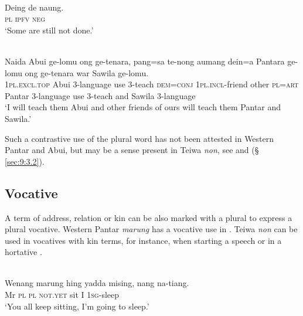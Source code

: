 \ea%
\label{ex:9:86}
 \\
\gll Deing de naung. \\
 \textsc{pl} \textsc{ipfv} \textsc{neg}   \\
\glt `Some are still not done.'
\z







\ea%
\label{ex:9:87}
 \\
\gll  Naida Abui ge-lomu ong ge-tenara,  pang=sa te-nong aumang dein=a  Pantara ge-lomu ong ge-tenara war Sawila ge-lomu. \\
  \textsc{1pl.excl.top} Abui 3-language use 3-teach  \textsc{dem=conj} \textsc{1pl.incl}-friend other \textsc{pl=art}   Pantar 3-language use 3-teach and Sawila 3-language  \\
\glt `I will teach them Abui and other friends of ours  will teach them Pantar and Sawila.'
\z

Such a contrastive use of the plural word has not been attested in Western Pantar and Abui, but may be a sense present in Teiwa \textit{non}, see  and  ({\S} \ref{sec:9:3.2}).

\subsection{Vocative} %
\label{sec:9:4.5}
A term of address, relation or kin can be also marked with a plural to express a plural vocative. Western Pantar \textit{marung} has a vocative use in . Teiwa \textit{non} can be used in vocatives with kin terms, for instance, when starting a speech  or in a hortative .


\ea%
\label{ex:9:88}
 \\
\gll  Wenang  marung hing yadda mising, nang {na-ti}{{\textglotstop}}{ang.} \\
   Mr  \textsc{pl} \textsc{pl} \textsc{not.yet} sit I \textsc{1sg}-sleep  \\
\glt `You all keep sitting, I'm going to sleep.'
\z







